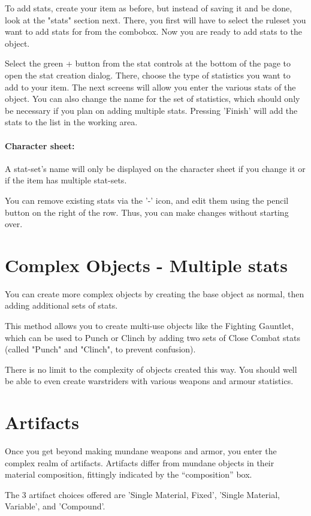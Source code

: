 To add stats, create your item as before, but instead of saving it and be done, look at the "stats" section next. 
There, you first will have to select the ruleset you want to add stats for from the combobox. Now you are ready to add stats to the object. 

Select the green + button from the stat controls at the bottom of the page to open the stat creation dialog. There, choose the type of statistics you want to add to your item. The next screens will allow you enter the various stats of the object.  You can also change the name for the set of statistics, which should only be necessary if you plan on adding multiple stats. Pressing 'Finish' will add the stats to the list in the working area.
\paragraph{Character sheet:}  A stat-set's name will only be displayed on the character sheet if you change it or if the item has multiple stat-sets.

You can remove existing stats via the '-' icon, and edit them using the pencil button on the right of the row. Thus, you can make changes without starting over.

\section{Complex Objects - Multiple stats}
You can create more complex objects by creating the base object as normal, then adding additional sets of stats.   

This method allows you to create multi-use objects like the Fighting Gauntlet, which can be used to Punch or Clinch by adding two sets of Close Combat stats (called "Punch" and "Clinch", to prevent confusion).

There is no limit to the complexity of objects created this way. You should well be able to even create warstriders with various weapons and armour statistics. 

\section{Artifacts}
Once you get beyond making mundane weapons and armor, you enter the complex realm of artifacts. Artifacts differ from mundane objects in their material composition, fittingly indicated by the "`composition"' box.

The 3 artifact choices offered are 'Single Material, Fixed', 'Single Material, Variable', and 'Compound'.  

